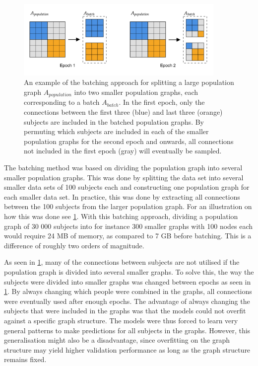 \begin{figure}[!htbp]
    \centering
    \includegraphics[width=0.9\textwidth]{chapters/images_methods/batching.png}
    \caption{An example of the batching approach for splitting a large population graph $A_{population}$ into two smaller population graphs, each corresponding to a batch $A_{batch}$. In the first epoch, only the connections between the first three (blue) and last three (orange) subjects are included in the batched population graphs. By permuting which subjects are included in each of the smaller population graphs for the second epoch and onwards, all connections not included in the first epoch (gray) will eventually be sampled.}
    \label{fig:batches}
\end{figure}

The batching method was based on dividing the population graph into several smaller population graphs. This was done by splitting the data set into several smaller data sets of 100 subjects each and constructing one population graph for each smaller data set. In practice, this was done by extracting all connections between the 100 subjects from the larger population graph. For an illustration on how this was done see \cref{fig:batches}. With this batching approach, dividing a population graph of 30 000 subjects into for instance 300 smaller graphs with 100 nodes each would require 24 MB of memory, as compared to 7 GB before batching. This is a difference of roughly two orders of magnitude.

As seen in \cref{fig:batches}, many of the connections between subjects are not utilised if the population graph is divided into several smaller graphs. To solve this, the way the subjects were divided into smaller graphs was changed between epochs as seen in \cref{fig:batches}. By always changing which people were combined in the graphs, all connections were eventually used after enough epochs. The advantage of always changing the subjects that were included in the graphs was that the models could not overfit against a specific graph structure. The models were thus forced to learn very general patterns to make predictions for all subjects in the graphs. However, this generalisation might also be a disadvantage, since overfitting on the graph structure may yield higher validation performance as long as the graph structure remains fixed. 

